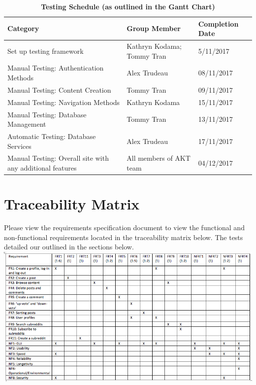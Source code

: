 \documentclass[12pt,fleqn]{article}
\begin{document}
\begin{table}[ht]
\caption{\bf Testing Schedule (as outlined in the Gantt Chart)}
{\color{red}\begin{tabularx}{\textwidth}{p{7.5cm}p{5cm}X}
\toprule {\bf Category} & {\bf Group Member} & {\bf Completion Date}\\
\midrule
Set up testing framework & Kathryn Kodama; Tommy Tran & 5/11/2017 \\
Manual Testing: Authentication Methods & Alex Trudeau & 08/11/2017\\
Manual Testing: Content Creation & Tommy Tran & 09/11/2017 \\
Manual Testing: Navigation Methods & Kathryn Kodama & 15/11/2017\\ 
Manual Testing: Database Management & Tommy Tran & 13/11/2017\\
Automatic Testing: Database Services & Alex Trudeau & 17/11/2017\\
Manual Testing: Overall site with any additional features & All members of AKT team & 04/12/2017\\
\bottomrule
\end{tabularx}}
\end{table}


\pagebreak

{\color{red}\section{Traceability Matrix}
Please view the requirements specification document to view the functional and non-functional requirements located in the traceability matrix below.  The tests detailed our outlined in the sections below.\\
\newline
\includegraphics[scale=0.55]{matrix.png}
}
\pagebreak
\end{document}
